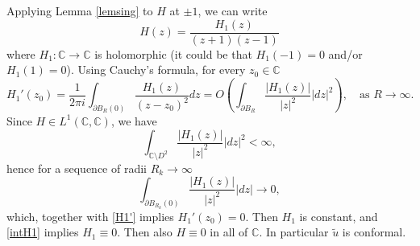 \documentclass[12pt, a4paper]{article}
\renewcommand{\(}{\left(}
\renewcommand{\)}{\right)}
\begin{document}
Applying Lemma \ref{lemsing} to $H$ at $\pm 1$, we can write
$$H(z)=\frac{H_1(z)}{(z+1)(z-1)}$$
where $H_1:\mathbb{C}\to \mathbb{C}$ is holomorphic (it could be that $H_1(-1)=0$ and/or $H_1(1)=0$).
Using Cauchy's formula, for every $z_0\in \mathbb{C}$
\begin{equation}\label{H1'}
H_1'(z_0)=\frac{1}{2\pi i}\int_{\partial B_R(0)}\frac{H_1(z)}{(z-z_0)^2}dz=O\left(\int_{\partial B_R}\frac{|H_1(z)|}{|z|^2}|dz|^2\right),\quad \text{as }R\to\infty.
\end{equation}
Since $H\in L^1(\mathbb{C},\mathbb{C})$, we have
\begin{equation}\label{intH1}
\int_{\mathbb{C}\setminus D^2}\frac{|H_1(z)|}{|z|^2}|dz|^2<\infty,
\end{equation}
hence for a sequence of radii $R_k\to \infty$
$$\int_{\partial B_{R_k}(0)}\frac{|H_1(z)|}{|z|^2}|dz|\to 0,$$
which, together with \eqref{H1'} implies $H_1'(z_0)=0$. Then $H_1$ is constant, and  \eqref{intH1} implies $H_1\equiv 0$.
Then also $H\equiv 0$ in all of $\mathbb{C}$. In particular $\tilde u$ is conformal.


\medskip
\end{document}
